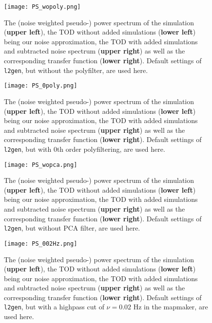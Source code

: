 \documentclass{aastex62}
\begin{document}
\begin{figure}
    \texttt{[image: PS\_wopoly.png]}
    \caption{The (noise weighted pseudo-) power spectrum of the simulation (\textbf{upper left}), the TOD without added simulations (\textbf{lower left}) being our noise approximation, the TOD with added simulations and subtracted noise spectrum (\textbf{upper right}) as well as the corresponding transfer function (\textbf{lower right}). Default settings of \texttt{l2gen}, but without the polyfilter, are used here.} 
    \label{fig:fig1}
\end{figure}

\begin{figure}
    \texttt{[image: PS\_0poly.png]}
    \caption{The (noise weighted pseudo-) power spectrum of the simulation (\textbf{upper left}), the TOD without added simulations (\textbf{lower left}) being our noise approximation, the TOD with added simulations and subtracted noise spectrum (\textbf{upper right}) as well as the corresponding transfer function (\textbf{lower right}). Default settings of \texttt{l2gen}, but with 0th order polyfiltering, are used here.} 
    \label{fig:fig2}
\end{figure}

\begin{figure}
    \texttt{[image: PS\_wopca.png]}
    \caption{The (noise weighted pseudo-) power spectrum of the simulation (\textbf{upper left}), the TOD without added simulations (\textbf{lower left}) being our noise approximation, the TOD with added simulations and subtracted noise spectrum (\textbf{upper right}) as well as the corresponding transfer function (\textbf{lower right}). Default settings of \texttt{l2gen}, but without PCA filter, are used here.} 
    \label{fig:fig3}
\end{figure}

\begin{figure}
    \texttt{[image: PS\_002Hz.png]}
    \caption{The (noise weighted pseudo-) power spectrum of the simulation (\textbf{upper left}), the TOD without added simulations (\textbf{lower left}) being our noise approximation, the TOD with added simulations and subtracted noise spectrum (\textbf{upper right}) as well as the corresponding transfer function (\textbf{lower right}). Default settings of \texttt{l2gen}, but with a highpass cut of $\nu = 0.02$ Hz in the mapmaker, are used here.} 
    \label{fig:fig4}
\end{figure}
\end{document}
